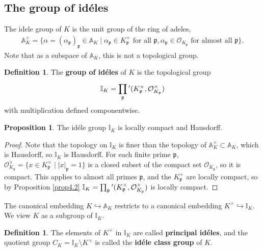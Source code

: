 \documentclass{article}
\theoremstyle{definition}
\newtheorem{prop}[theorem]{Proposition}
\newtheorem{defn}[theorem]{Definition}
\begin{document}
\subsection{The group of id\'eles}
The idele group of $K$ is the unit group of the ring of adeles,
\begin{align*}
    \mathbb{A}_K^\times = \{\alpha = (\alpha_{\mathfrak{p}})_{\mathfrak{p}} \in \mathbb{A}_K \mid \alpha_{\mathfrak{p}} \in K_{\mathfrak{p}}^\times \text{ for all }\mathfrak{p}, \alpha_{\mathfrak{p}} \in \mathcal{O}_{K_{\mathfrak{p}}} \text{ for almost all }\mathfrak{p}\}.
\end{align*}
Note that as a subspace of $\mathbb{A}_K$, this is not a topological group.
\begin{defn}\label{defn4.5}
    The \textbf{group of id\'eles} of $K$ is the topological group 
    \[
    \mathbb{I}_K = \prod_{\mathfrak{p}}^{} \hspace{0mm}' (K_{\mathfrak{p}}^\times, \mathcal{O}_{K_{\mathfrak{p}}}^\times)
    \]
    with multiplication defined componentwise.
\end{defn}
\begin{prop}\label{prop4.6}
    The id\'ele group $\mathbb{I}_K$ is locally compact and Hausdorff.
\end{prop}
\begin{proof}
    Note that the topology on $\mathbb{I}_K$ is finer than the topology of $\mathbb{A}_K^\times \subset \mathbb{A}_K$, which is Hausdorff, so $\mathbb{I}_K$ is Hausdorff. For each finite prime $\mathfrak{p}$, $\mathcal{O}_{K_{\mathfrak{p}}}^\times = \{x \in K_{\mathfrak{p}}^\times \mid \left|x\right|_{\mathfrak{p}}=1\}$ is a closed subset of the compact set $\mathcal{O}_{K_{\mathfrak{p}}}$, so it is compact. This applies to almost all primes $\mathfrak{p}$, and the $K_{\mathfrak{p}}^\times$ are locally compact, so by Proposition \ref{prop4.2} $\mathbb{I}_K = \prod_{\mathfrak{p}}^{} \hspace{0mm}' (K_{\mathfrak{p}}^\times, \mathcal{O}_{K_{\mathfrak{p}}}^\times)$ is locally compact.
\end{proof}
The canonical embedding $K \hookrightarrow \mathbb{A}_K$ restricts to a canonical embedding $K^\times \hookrightarrow \mathbb{I}_K$. We view $K$ as a subgroup of $\mathbb{I}_K$.
\begin{defn}\label{defn4.7}
    The elements of $K^\times$ in $\mathbb{I}_K$ are called \textbf{principal id\'eles}, and the quotient group $C_K = \mathbb{I}_K\setminus K^\times$ is called the \textbf{id\'ele class group} of $K$.
\end{defn}
\end{document}
